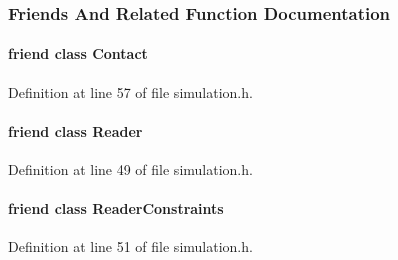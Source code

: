 \subsubsection{Friends And Related Function Documentation}
\hypertarget{classmknix_1_1_simulation_a76d4b1c8c6040df20040808941b7e764}{}
\paragraph[{Contact}]{\setlength{\rightskip}{0pt plus 5cm}friend class {\bf Contact}\hspace{0.3cm}{\ttfamily [friend]}}\label{classmknix_1_1_simulation_a76d4b1c8c6040df20040808941b7e764}


Definition at line 57 of file simulation.\+h.

\hypertarget{classmknix_1_1_simulation_a35cb182752752c74a30050705acc3c06}{}
\paragraph[{Reader}]{\setlength{\rightskip}{0pt plus 5cm}friend class {\bf Reader}\hspace{0.3cm}{\ttfamily [friend]}}\label{classmknix_1_1_simulation_a35cb182752752c74a30050705acc3c06}


Definition at line 49 of file simulation.\+h.

\hypertarget{classmknix_1_1_simulation_ae164a82e4890f6fbab13f95a18656edf}{}
\paragraph[{Reader\+Constraints}]{\setlength{\rightskip}{0pt plus 5cm}friend class {\bf Reader\+Constraints}\hspace{0.3cm}{\ttfamily [friend]}}\label{classmknix_1_1_simulation_ae164a82e4890f6fbab13f95a18656edf}


Definition at line 51 of file simulation.\+h.

\hypertarget{classmknix_1_1_simulation_a1150cceac3e81192653459c61f428621}{}
